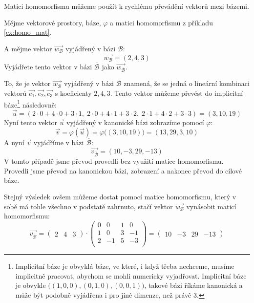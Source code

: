 Matici homomorfismu můžeme použít k rychlému převádění vektorů mezi bázemi.
\begin{example}
    Mějme vektorové prostory, báze, $\varphi$ a matici homomorfismu
    z příkladu \ref{ex:homo_mat}.

    A mějme vektor $\vec{w_{\mathcal{B}}}$ vyjádřený v bázi $\mathcal{B}$:
    $$\vec{w_{\mathcal{B}}} = (2, 4, 3)$$
    Vyjádřete tento vektor v bázi $\overline{\mathcal{B}}$ jako
    $\vec{w_{\overline{\mathcal{B}}}}$.

    To, že je vektor $\vec{w_{\mathcal{B}}}$ vyjádřený v bázi $\mathcal{B}$ znamená,
    že se jedná o lineární kombinaci vektorů $\vec{e_1}, \vec{e_2}, \vec{e_3}$ s koeficienty
    $2, 4, 3$.
    Tento vektor můžeme převést do implicitní báze\footnote{Implicitní báze je obvyklá báze, ve
    které, i když třeba nechceme, musíme implicitně pracovat, abychom se mohli
    numericky vyjadřovat. Implicitní báze je obvykle
    $\big((1, 0, 0), (0, 1, 0), (0, 0, 1) \big)$, takové bázi říkáme kanonická a může být
    podobně vyjádřena i pro jiné dimenze, než právě 3.} následovně:
    $$\vec{u} = (2\cdot 0 + 4\cdot 0 + 3\cdot 1,\; 2\cdot 0 + 4\cdot 1 + 3\cdot 2,\;
    2\cdot 1 + 4\cdot 2 + 3\cdot 3) = (3, 10, 19)$$
    Nyní tento vektor $\vec{u}$ vyjádřený v kanonické bázi zobrazíme pomocí $\varphi$:
    $$\vec{v} = \varphi(\vec{u}) = \varphi\big( (3, 10, 19) \big) = (13, 29, 3, 10)$$
    A nyní $\vec{v}$ vyjádříme v bázi $\overline{\mathcal{B}}$:
    $$\vec{v_{\overline{\mathcal{B}}}} = (10, -3, 29, -13)$$
    V tomto případě jsme převod provedli bez využití matice homomorfismu. Provedli jsme převod
    na kanonickou bázi, zobrazení a nakonec převod do cílové báze.

    Stejný výsledek ovšem můžeme dostat pomocí matice homomorfismu, který v sobě má tohle
    všechno v podstatě zahrnuto, stačí vektor $\vec{w_{\mathcal{B}}}$ vynásobit maticí homomorfismu:
    \[
        \vec{v_{\overline{\mathcal{B}}}} =
        \begin{pmatrix}
            2 & 4 & 3
        \end{pmatrix} \cdot
        \begin{pmatrix}
            0 & 0 & 1 & 0\\
            1 & 0 & 3 & -1\\
            2 & -1 & 5 & -3\\
        \end{pmatrix} =
        \begin{pmatrix}
            10 & -3 & 29 & -13
        \end{pmatrix}
    \]
\end{example}

